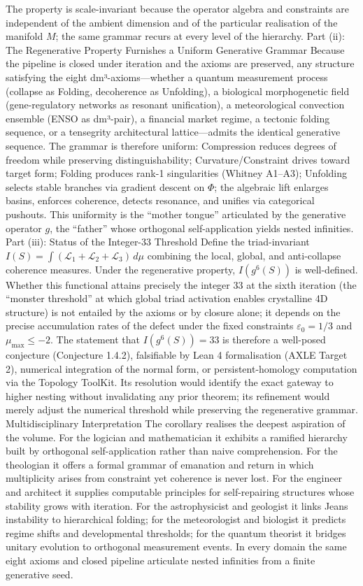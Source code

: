 The property is scale-invariant because the operator algebra and constraints are independent of the ambient dimension and of the particular realisation of the manifold $  M  $; the same grammar recurs at every level of the hierarchy.
Part (ii): The Regenerative Property Furnishes a Uniform Generative Grammar
Because the pipeline is closed under iteration and the axioms are preserved, any structure satisfying the eight dm³-axioms—whether a quantum measurement process (collapse as Folding, decoherence as Unfolding), a biological morphogenetic field (gene-regulatory networks as resonant unification), a meteorological convection ensemble (ENSO as dm³-pair), a financial market regime, a tectonic folding sequence, or a tensegrity architectural lattice—admits the identical generative sequence. The grammar is therefore uniform: Compression reduces degrees of freedom while preserving distinguishability; Curvature/Constraint drives toward target form; Folding produces rank-1 singularities (Whitney A1–A3); Unfolding selects stable branches via gradient descent on $  \Phi  $; the algebraic lift enlarges basins, enforces coherence, detects resonance, and unifies via categorical pushouts. This uniformity is the “mother tongue” articulated by the generative operator $  g  $, the “father” whose orthogonal self-application yields nested infinities.
Part (iii): Status of the Integer-33 Threshold
Define the triad-invariant
$   I(S) = \int (\mathcal{L}_1 + \mathcal{L}_2 + \mathcal{L}_3) \, d\mu   $
combining the local, global, and anti-collapse coherence measures. Under the regenerative property, $  I(g^6(S))  $ is well-defined. Whether this functional attains precisely the integer 33 at the sixth iteration (the “monster threshold” at which global triad activation enables crystalline 4D structure) is not entailed by the axioms or by closure alone; it depends on the precise accumulation rates of the defect under the fixed constraints $  \varepsilon_0 = 1/3  $ and $  \mu_{\max} \le -2  $. The statement that $  I(g^6(S)) = 33  $ is therefore a well-posed conjecture (Conjecture 1.4.2), falsifiable by Lean 4 formalisation (AXLE Target 2), numerical integration of the normal form, or persistent-homology computation via the Topology ToolKit. Its resolution would identify the exact gateway to higher nesting without invalidating any prior theorem; its refinement would merely adjust the numerical threshold while preserving the regenerative grammar.
Multidisciplinary Interpretation
The corollary realises the deepest aspiration of the volume. For the logician and mathematician it exhibits a ramified hierarchy built by orthogonal self-application rather than naive comprehension. For the theologian it offers a formal grammar of emanation and return in which multiplicity arises from constraint yet coherence is never lost. For the engineer and architect it supplies computable principles for self-repairing structures whose stability grows with iteration. For the astrophysicist and geologist it links Jeans instability to hierarchical folding; for the meteorologist and biologist it predicts regime shifts and developmental thresholds; for the quantum theorist it bridges unitary evolution to orthogonal measurement events. In every domain the same eight axioms and closed pipeline articulate nested infinities from a finite generative seed.
